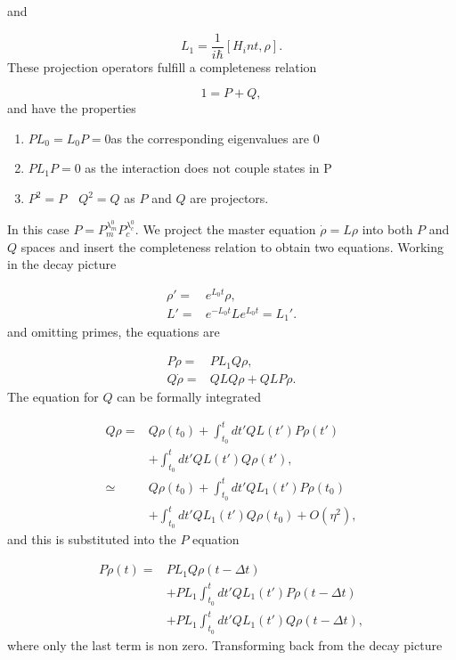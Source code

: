 \documentclass[reprint, amsmath,amssymb, aps,pra]{revtex4-1}
\begin{document}
and

\begin{equation}
L_1 = \frac{1}{i\hbar}[H_int,\rho].
\end{equation}These projection operators fulfill a completeness
relation

\begin{equation}
1 = P + Q,
\end{equation} and have the properties

\begin{enumerate}

\item $ PL_{0} = L_{0}P = 0 $\qquad as the corresponding eigenvalues are 0

\item $PL_{1}P=0$ \qquad as the interaction does not couple states in P

\item $P^2 = P \quad Q^2 = Q$ \qquad as $P$ and $Q$ are projectors.
\end{enumerate} In this case $P=P_m^{\lambda_m^0}P_c^{\lambda_c^0}$. We project the master equation $\dot{\rho}=L\rho$ into both $P$ and $Q$ spaces and insert the completeness relation to obtain two equations. Working in the decay picture

\begin{align*}
 \rho' =& e^{L_0t}\rho,\\
 L' =& e^{-L_0t}Le^{L_0t} = L_1'.
\end{align*} and omitting primes, the equations are

\begin{align*}
P\dot{\rho} =& PL_1Q\rho, \\
Q\dot{\rho} =& QLQ\rho + QLP\rho.
\end{align*} The equation for $Q$ can be formally integrated \cite{TesisMaestria}

\begin{align*}
Q\rho =& Q\rho(t_0) + \int_{t_0}^{t}dt' QL(t')P\rho(t')\\
       &+\int_{t_0}^{t}dt'QL(t')Q\rho(t'),\\
\simeq & Q\rho(t_0) + \int_{t_0}^{t}dt' QL_1(t')P\rho(t_0)\\
       &+\int_{t_0}^{t}dt'QL_1(t')Q\rho(t_0)+O(\eta^2),
\end{align*} and this is substituted into the $P$ equation

\begin{align}
P\dot{\rho}(t) =& PL_1Q\rho(t-\Delta t)\\ 
 &+ PL_1\int_{t_0}^{t}dt' QL_1(t')P\rho(t-\Delta t)\nonumber \\
 &+ PL_1\int_{t_0}^{t}dt'QL_1(t')Q\rho(t-\Delta t) \nonumber,
\end{align} where only the last term is non zero. Transforming back from the decay picture
\end{document}
